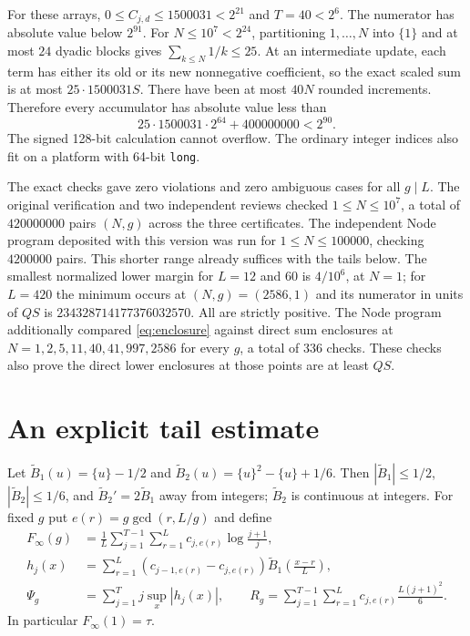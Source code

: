 \documentclass[10pt]{article}
\theoremstyle{remark}
\newcommand{\B}{\widetilde B}
\begin{document}
For these arrays, $0\le C_{j,d}\le1500031<2^{21}$ and $T=40<2^6$.
The numerator has absolute value below $2^{91}$. For $N\le10^7<2^{24}$,
partitioning $1,\ldots,N$ into $\{1\}$ and at most $24$ dyadic blocks
gives $\sum_{k\le N}1/k\le25$. At an intermediate update, each term
has either its old or its new nonnegative coefficient, so the exact
scaled sum is at most $25\cdot1500031 S$. There have been at most
$40N$ rounded increments. Therefore every accumulator has absolute value
less than
\[
 25\cdot1500031\cdot2^{64}+400000000<2^{90}.
\]
The signed 128-bit calculation cannot overflow. The ordinary integer
indices also fit on a platform with 64-bit \texttt{long}.

The exact checks gave zero violations and zero ambiguous cases for all
$g\mid L$. The original verification and two independent reviews checked
$1\le N\le10^7$, a total of $420000000$ pairs $(N,g)$ across the
three certificates. The independent Node program deposited with this
version was run for $1\le N\le100000$, checking $4200000$ pairs.
This shorter range already suffices with the tails below.
The smallest normalized lower margin for $L=12$ and $60$ is
$4/10^6$, at $N=1$; for $L=420$ the minimum occurs at $(N,g)=(2586,1)$
and its numerator in units of $QS$ is $234328714177376032570$.
All are strictly positive. The Node program additionally compared
\eqref{eq:enclosure} against direct sum enclosures at
$N=1,2,5,11,40,41,997,2586$ for every $g$, a total of $336$ checks.
These checks also prove the direct lower enclosures at those points
are at least $QS$.

\section{An explicit tail estimate}\label{sec:tail}
Let $\B_1(u)=\{u\}-1/2$ and $\B_2(u)=\{u\}^2-\{u\}+1/6$.
Then $|\B_1|\le1/2$, $|\B_2|\le1/6$, and $\B_2'=2\B_1$ away
from integers; $\B_2$ is continuous at integers. For fixed $g$ put
$e(r)=g\gcd(r,L/g)$ and define
\begin{align*}
 F_\infty(g)&=\frac1L\sum_{j=1}^{T-1}\sum_{r=1}^L
 c_{j,e(r)}\log\frac{j+1}{j},\\
 h_j(x)&=\sum_{r=1}^L(c_{j-1,e(r)}-c_{j,e(r)})
 \B_1\left(\frac{x-r}{L}\right),\\
 \Psi_g&=\sum_{j=1}^T j\sup_x|h_j(x)|,\qquad
 R_g=\sum_{j=1}^{T-1}\sum_{r=1}^L
 c_{j,e(r)}\frac{L(j+1)^2}{6}.
\end{align*}
In particular $F_\infty(1)=\tau$.
\end{document}

